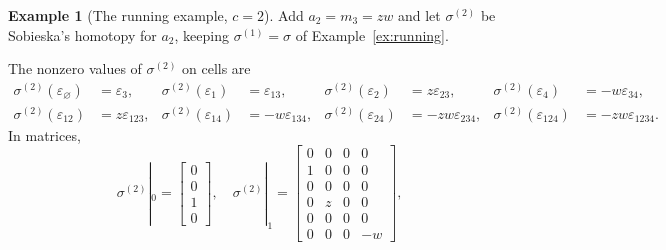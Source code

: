 \documentclass[12pt]{amsart}
\theoremstyle{plain}
\theoremstyle{definition}
\newtheorem{example}[theorem]{Example}
\newcommand{\eps}{\varepsilon}
\begin{document}
\begin{example}[The running example, $c = 2$]\label{ex:runningtwo}
    Add $a_2 = m_3 = zw$ and let $\sigma^{(2)}$ be Sobieska's homotopy for $a_2$, keeping $\sigma^{(1)} = \sigma$ of Example~\ref{ex:running}.

    The nonzero values of $\sigma^{(2)}$ on cells are
    \[
        \begin{aligned}
            \sigma^{(2)}(\eps_\varnothing) &= \eps_3, & \sigma^{(2)}(\eps_1) &= \eps_{13}, & \sigma^{(2)}(\eps_2) &= z \eps_{23}, & \sigma^{(2)}(\eps_4) &= -w \eps_{34},\\
            \sigma^{(2)}(\eps_{12}) &= z \eps_{123}, & \sigma^{(2)}(\eps_{14}) &= -w \eps_{134}, & \sigma^{(2)}(\eps_{24}) &= -zw \eps_{234}, & \sigma^{(2)}(\eps_{124}) &= -zw \eps_{1234}.
        \end{aligned}
    \]
    In matrices,
    \[
        \sigma^{(2)}|_0 = \begin{bmatrix} 0\\ 0\\ 1\\ 0 \end{bmatrix}, \quad
        \sigma^{(2)}|_1 = \begin{bmatrix} 0 & 0 & 0 & 0\\ 1 & 0 & 0 & 0\\ 0 & 0 & 0 & 0\\ 0 & z & 0 & 0\\ 0 & 0 & 0 & 0\\ 0 & 0 & 0 & -w \end{bmatrix},
    \]


\end{example}
\end{document}
